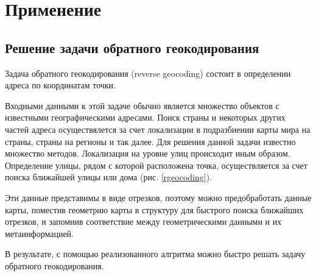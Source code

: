 \chapter{Применение}
\section{Решение задачи обратного геокодирования}
Задача обратного геокодирования (reverse geocoding) состоит в
определении адреса по координатам точки.

Входными данными к этой задаче обычно является множество объектов
с известными географическими адресами. Поиск страны и некоторых других частей
адреса осуществялется за счет локализации в подразбиении карты мира на страны, 
страны на регионы и так далее. Для решения данной задачи известно множество методов.
Локализация на уровне улиц происходит иным образом. Определение улицы, рядом с 
которой расположена точка, осуществляется за счет поиска ближайшей улицы или дома (рис. \ref{rgeocoding}).

Эти данные представимы в виде отрезков, поэтому можно предобработать данные карты,
поместив геометрию карты в структуру для быстрого поиска ближайших отрезков, и запомнив
соответствие между геометрическими данными и их метаинформацией.

В результате, с помощью реализованного алгритма можно быстро решать задачу обратного геокодирования.


\FloatBarrier
